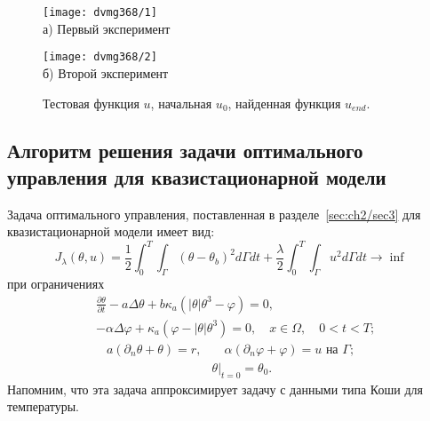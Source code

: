 \begin{figure}[h!t]
    \begin{minipage}[b][][b]{0.49\linewidth}
        \centering
        \texttt{[image: dvmg368/1]} \\ а) Первый эксперимент
    \end{minipage}
    \hfill
    \begin{minipage}[b][][b]{0.49\linewidth}
        \centering
        \texttt{[image: dvmg368/2]} \\ б) Второй эксперимент
    \end{minipage}
    \caption{Тестовая функция $u$, начальная $u_0$, найденная функция $u_{end}.$}
    \label{fig:4_3:control}
\end{figure}

\subsection{Алгоритм решения задачи оптимального управления для квазистационарной модели}
\label{subsec:ch4/sec3/quasistationary}
Задача оптимального управления, поставленная в разделе~\ref{sec:ch2/sec3}
для квазистационарной модели имеет вид:
\begin{equation*}
    J_{\lambda}(\theta, u)=\frac{1}{2} \int_{0}^{T}
    \int_{\Gamma}\left(\theta-\theta_{b}\right)^{2} d \Gamma d t+\frac{\lambda}{2}
    \int_{0}^{T} \int_{\Gamma} u^{2} d \Gamma d t \rightarrow \inf
\end{equation*}
при ограничениях
\begin{equation}
    \label{eq:4_3:1}
    \begin{split}
        & \frac{\partial \theta}{\partial t} - a \Delta \theta
        + b \kappa_{a} \left(|\theta| \theta^{3}-\varphi\right) = 0,\\
        & - \alpha \Delta \varphi
        + \kappa_{a} \left(\varphi-|\theta| \theta^{3}\right) = 0,
        \quad x \in \Omega, \quad 0 < t < T;
    \end{split}
\end{equation}
\begin{align}
    a \left(\partial_{n} \theta+\theta\right)=r,
    & \quad \alpha\left(\partial_{n} \varphi
    + \varphi\right) = u \text { на } \Gamma;  \label{eq:4_3:2}\\
    & \left.\theta\right|_{t=0} = \theta_{0}. \label{eq:4_3:3}
\end{align}
Напомним, что эта задача аппроксимирует задачу с данными типа Коши для температуры.


